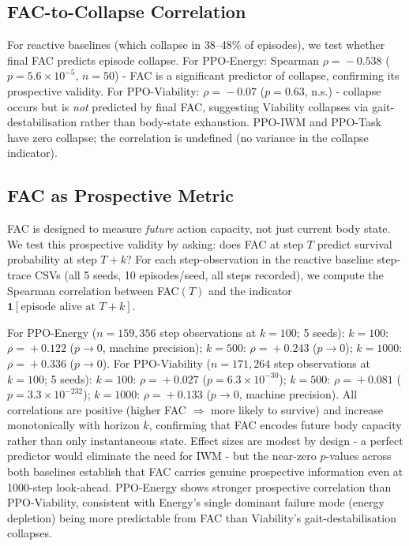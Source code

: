 \documentclass{article}
\begin{document}
{\subsection{FAC-to-Collapse Correlation}
\label{app:fac_collapse}
For reactive baselines (which collapse in 38--48\% of episodes), we test whether final FAC predicts episode collapse. For PPO-Energy: Spearman $\rho\!=\!-0.538$ ($p\!=\!5.6\!\times\!10^{-5}$, $n\!=\!50$) - FAC is a significant predictor of collapse, confirming its prospective validity. For PPO-Viability: $\rho\!=\!-0.07$ ($p\!=\!0.63$, n.s.) - collapse occurs but is \emph{not} predicted by final FAC, suggesting Viability collapses via gait-destabilisation rather than body-state exhaustion. PPO-IWM and PPO-Task have zero collapse; the correlation is undefined (no variance in the collapse indicator).

\vspace{-6pt}
\subsection{FAC as Prospective Metric}
\label{app:fac_prospective}
FAC is designed to measure \emph{future} action capacity, not just current body state. We test this prospective validity by asking: does FAC at step $T$ predict survival probability at step $T\!+\!k$? For each step-observation in the reactive baseline step-trace CSVs (all 5 seeds, 10 episodes/seed, all steps recorded), we compute the Spearman correlation between FAC$(T)$ and the indicator $\mathbf{1}[\text{episode alive at } T\!+\!k]$.

For PPO-Energy ($n\!=\!159{,}356$ step observations at $k\!=\!100$; 5 seeds): $k\!=\!100$: $\rho\!=\!+0.122$ ($p\!\to\!0$, machine precision); $k\!=\!500$: $\rho\!=\!+0.243$ ($p\!\to\!0$); $k\!=\!1000$: $\rho\!=\!+0.336$ ($p\!\to\!0$). For PPO-Viability ($n\!=\!171{,}264$ step observations at $k\!=\!100$; 5 seeds): $k\!=\!100$: $\rho\!=\!+0.027$ ($p\!=\!6.3\!\times\!10^{-30}$); $k\!=\!500$: $\rho\!=\!+0.081$ ($p\!=\!3.3\!\times\!10^{-232}$); $k\!=\!1000$: $\rho\!=\!+0.133$ ($p\!\to\!0$, machine precision). All correlations are positive (higher FAC $\Rightarrow$ more likely to survive) and increase monotonically with horizon $k$, confirming that FAC encodes future body capacity rather than only instantaneous state. Effect sizes are modest by design - a perfect predictor would eliminate the need for IWM - but the near-zero $p$-values across both baselines establish that FAC carries genuine prospective information even at 1000-step look-ahead. PPO-Energy shows stronger prospective correlation than PPO-Viability, consistent with Energy's single dominant failure mode (energy depletion) being more predictable from FAC than Viability's gait-destabilisation collapses.

}
\end{document}
